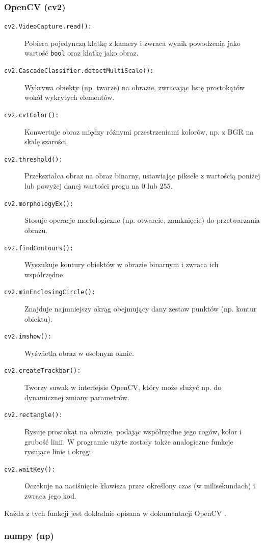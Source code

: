 \documentclass[a4paper,twoside,12pt]{book}
\begin{document}
\subsubsection{OpenCV (cv2)}

\begin{description} 
	\item[\texttt{cv2.VideoCapture.read():}] Pobiera pojedynczą klatkę z kamery i zwraca wynik powodzenia jako wartość \texttt{bool} oraz klatkę jako obraz.
	\item[\texttt{cv2.CascadeClassifier.detectMultiScale():}] Wykrywa obiekty (np. twarze) na obrazie, zwracając listę prostokątów wokół wykrytych elementów.
	\item[\texttt{cv2.cvtColor():}] Konwertuje obraz między różnymi przestrzeniami kolorów, np. z BGR na skalę szarości.
	\item[\texttt{cv2.threshold():}] Przekształca obraz na obraz binarny, ustawiając piksele z wartością poniżej lub powyżej danej wartości progu na $0$ lub $255$.
	\item[\texttt{cv2.morphologyEx():}] Stosuje operacje morfologiczne (np. otwarcie, zamknięcie) do przetwarzania obrazu.
	\item[\texttt{cv2.findContours():}] Wyszukuje kontury obiektów w obrazie binarnym i zwraca ich współrzędne.
	\item[\texttt{cv2.minEnclosingCircle():}] Znajduje najmniejszy okrąg obejmujący dany zestaw punktów (np. kontur obiektu).
	\item[\texttt{cv2.imshow():}] Wyświetla obraz w osobnym oknie.
	\item[\texttt{cv2.createTrackbar():}] Tworzy suwak w interfejsie OpenCV, który może służyć np. do dynamicznej zmiany parametrów.
	\item[\texttt{cv2.rectangle():}] Rysuje prostokąt na obrazie, podając współrzędne jego rogów, kolor i grubość linii. W programie użyte zostały także analogiczne funkcje rysujące linie i okręgi.
	\item[\texttt{cv2.waitKey():}] Oczekuje na naciśnięcie klawisza przez określony czas (w milisekundach) i zwraca jego kod.
\end{description}

Każda z tych funkcji jest dokładnie opisana w dokumentacji OpenCV \cite{bib:OpenCV-funkcje}.

\subsubsection{numpy (np)}
\end{document}

